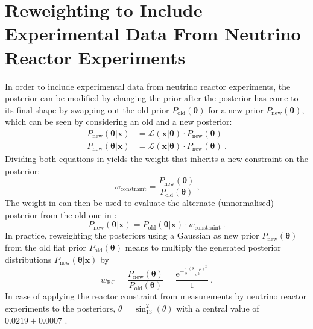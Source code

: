 \section{Reweighting to Include Experimental Data From Neutrino Reactor Experiments}
In order to include experimental data from neutrino reactor experiments, the posterior can be modified by changing the prior after the posterior has come to its final shape by swapping out the old prior $P_\text{old}(\boldsymbol{\theta})$ for a new prior $P_\text{new}(\boldsymbol{\theta})$, which can be seen by considering an old and a new posterior:
%
\begin{equation} \label{eq:old_new_posterior}
    \begin{aligned}
        P_\text{new}(\boldsymbol{\theta}|\boldsymbol{x}) &=  \mathcal{L}(\boldsymbol{x}|\boldsymbol{\theta}) \cdot P_\text{new}(\boldsymbol{\theta}) \\
        P_\text{new}(\boldsymbol{\theta}|\boldsymbol{x})  &= \mathcal{L}(\boldsymbol{x}|\boldsymbol{\theta}) \cdot P_\text{new}(\boldsymbol{\theta})
        \ \text{.}
    \end{aligned}
\end{equation}  
%
Dividing both equations in  yields the weight that inherits a new constraint on the posterior:
%
\begin{equation} \label{eq:reweight_posterior_weight}
 w_\text{constraint} = \frac{P_\text{new}(\boldsymbol{\theta})}{P_\text{old}(\boldsymbol{\theta})}
 \ \text{,}
\end{equation}  
%
The weight in  can then be used to evaluate the alternate (unnormalised) posterior from the old one in :
%
\begin{equation} \label{eq:unnormalised_posterior_reweighted}
 P_\text{new}(\boldsymbol{\theta}|\boldsymbol{x}) = P_\text{old}(\boldsymbol{\theta}|\boldsymbol{x}) \cdot w_\text{constraint}
 \ \text{.}
\end{equation}  
%
In practice, reweighting the posteriors using a Gaussian as new prior $P_\text{new}(\boldsymbol{\theta})$ from the old flat prior $P_\text{old}(\boldsymbol{\theta})$ means to multiply the generated posterior distributions $P_\text{new}(\boldsymbol{\theta}|\boldsymbol{x})$ by
%
\begin{equation} \label{eq:unnormalised_posterior_reweighted}
 w_\text{RC} 
 =
 \frac{P_\text{new}(\boldsymbol{\theta})}{P_\text{old}(\boldsymbol{\theta})}
 = \frac{\text{e}^{-\frac{1}{2} \frac{(\theta - \mu)^2}{\sigma^2}}}{1}
 \ \text{.}
\end{equation}  
%
In case of applying the reactor constraint from measurements by neutrino reactor experiments to the posteriors, $\theta = \sin^2_{13}(\theta)$ with a central value of $0.0219 \pm 0.0007$ \cite{PDG here}.


